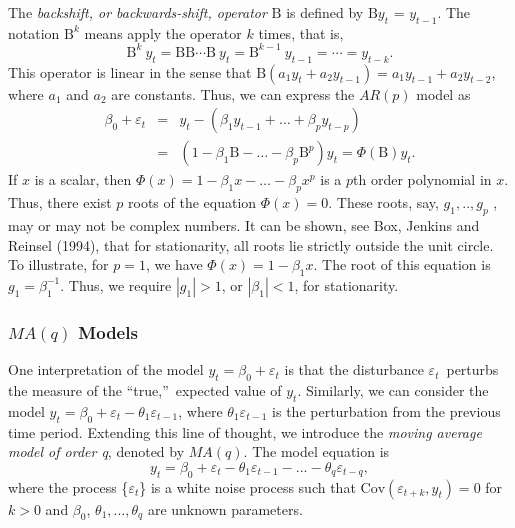 The \emph{backshift, or backwards-shift, operator} $\mathrm{B}$ is
defined by $\mathrm{B}y_t$ = $y_{t-1}$. The notation
$\mathrm{B}^{k}$ means apply the operator $k$ times, that is,
\begin{equation*}
\mathrm{B}^{k}~y_t = \mathrm{BB \cdots B~} y_t = \mathrm{B}
^{k-1}~y_{t-1} = \cdots = y_{t-k}.
\end{equation*}%
This operator is linear in the sense that $\mathrm{B} (a_1 y_t + a_2
y_{t-1}) = a_1 y_{t-1} + a_2 y_{t-2}$, where $a_1$ and $a_2$ are
constants. Thus, we can express the $AR(p)$ model as
\begin{eqnarray*}
\beta_0 + \varepsilon_t &=& y_t - \left( \beta_1 y_{t-1} + \ldots +
\beta_p y_{t-p}\right)  \\
&=& \left(1-\beta_1 \mathrm{B} - \ldots - \beta_p
\mathrm{B}^{p}\right) y_t = \Phi \left( \mathrm{B}\right) y_t.
\end{eqnarray*}
If $x$ is a scalar, then $\Phi \left( x\right) = 1 - \beta_1 x -
\ldots - \beta_p x^p$ is a $p$th order polynomial in $x$. Thus,
there exist $p$ roots of the equation $\Phi \left( x\right) =0$.
These roots, say, $g_1,..,g_p$ , may or may not be complex numbers.
It can be shown, see Box, Jenkins and Reinsel (1994), that for
stationarity, all roots lie strictly outside the unit circle. To
illustrate, for $p=1$, we have $\Phi \left( x\right) = 1 - \beta_1
x$. The root of this equation is $g_1 = \beta_1^{-1}$. Thus, we
require $|g_1|>1$, or $|\beta_1|<1$, for stationarity.

\subsubsection*{$MA(q)$ Models}

One interpretation of the model $y_t=\beta_0+\varepsilon_t$ is that
the disturbance $\varepsilon_t$\ perturbs the measure of the
\textquotedblleft true,\textquotedblright\ expected value of $y_t.$
Similarly, we can consider the model $y_t=\beta_0 + \varepsilon
_t-\theta_1\varepsilon_{t-1}$, where $\theta_1 \varepsilon_{t-1}$ is
the perturbation from the previous time period. Extending this line
of thought, we introduce the \emph{moving average model of order q},
denoted by
$MA(q)$. The model equation is%
\begin{equation}\label{E8:MAq}
y_t = \beta_0 + \varepsilon_t - \theta_1 \varepsilon_{t-1} - \ldots
- \theta_q \varepsilon_{t-q},
\end{equation}
where the process \{$\varepsilon_t$\} is a white noise process such
that $\mathrm{Cov}(\varepsilon_{t+k}, y_t)=0$ for $k>0$ and
$\beta_0$, $\theta_1, \ldots, \theta_q$ are unknown parameters.


